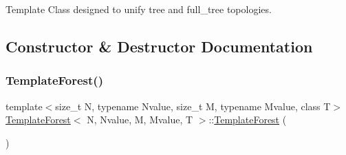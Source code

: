 Template Class designed to unify tree and full\+\_\+tree topologies. 

\subsection{Constructor \& Destructor Documentation}
\mbox{\label{classTemplateForest_a48ebaf92fb390fd229a2438f99145881}} 
\subsubsection{\texorpdfstring{Template\+Forest()}{TemplateForest()}\hspace{0.1cm}{\footnotesize\ttfamily [1/2]}}
{\footnotesize\ttfamily template$<$size\+\_\+t N, typename Nvalue, size\+\_\+t M, typename Mvalue, class T$>$ \\
\mbox{\hyperlink{classTemplateForest}{Template\+Forest}}$<$ N, Nvalue, M, Mvalue, T $>$\+::\mbox{\hyperlink{classTemplateForest}{Template\+Forest}} (\begin{DoxyParamCaption}{ }\end{DoxyParamCaption})\hspace{0.3cm}{\ttfamily [inline]}}

\mbox{\label{classTemplateForest_ab842720aca5e202357e399ba835565b7}} 
